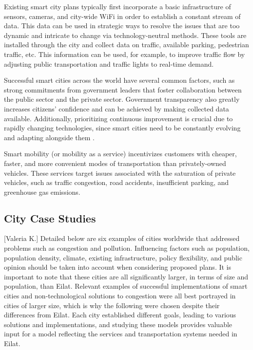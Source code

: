 \documentclass[12pt]{article}                               %
\begin{document}
Existing smart city plans typically first incorporate a basic infrastructure of sensors, cameras, and city-wide WiFi in order to establish a constant stream of data. This data can be used in strategic ways to resolve the issues that are too dynamic and intricate to change via technology-neutral methods. These tools are installed through the city and collect data on traffic, available parking, pedestrian traffic, etc. This information can be used, for example, to improve traffic flow by adjusting public transportation and traffic lights to real-time demand.

Successful smart cities across the world have several common factors, such as strong commitments from government leaders that foster collaboration between the public sector and the private sector. Government transparency also greatly increases citizens' confidence and can be achieved by making collected data available. Additionally, prioritizing continuous improvement is crucial due to rapidly changing technologies, since smart cities need to be constantly evolving and adapting alongside them \cite{Zanghi2017WhyExamples}. 

Smart mobility (or mobility as a service) incentivizes customers with cheaper, faster, and more convenient modes of transportation than privately-owned vehicles. These services target issues associated with the saturation of private vehicles, such as traffic congestion, road accidents, insufficient parking, and greenhouse gas emissions.

\subsection{City Case Studies}[Valeria K.]
Detailed below are six examples of cities worldwide that addressed problems such as congestion and pollution. Influencing factors such as population, population density, climate, existing infrastructure, policy flexibility, and public opinion should be taken into account when considering proposed plans. It is important to note that these cities are all significantly larger, in terms of size and population, than Eilat. Relevant examples of successful implementations of smart cities and non-technological solutions to congestion were all best portrayed in cities of larger size, which is why the following were chosen despite their differences from Eilat. Each city established different goals, leading to various solutions and implementations, and studying these models provides valuable input for a model reflecting the services and transportation systems needed in Eilat.
\end{document}
